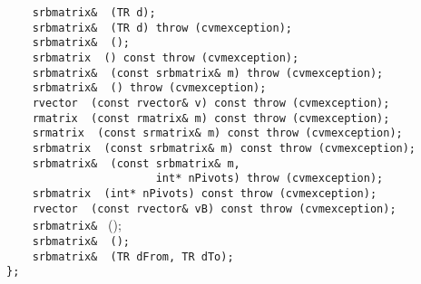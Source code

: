 \verb"    srbmatrix& "\verb" (TR d);"\\
\verb"    srbmatrix& "\verb" (TR d) throw (cvmexception);"\\
\verb"    srbmatrix& "\verb" ();"\\
\verb"    srbmatrix "\verb" () const throw (cvmexception);"\\
\verb"    srbmatrix& "\verb" (const srbmatrix& m) throw (cvmexception);"\\
\verb"    srbmatrix& "\verb" () throw (cvmexception);"\\
\verb"    rvector "\verb" (const rvector& v) const throw (cvmexception);"\\
\verb"    rmatrix "\verb" (const rmatrix& m) const throw (cvmexception);"\\
\verb"    srmatrix "\verb" (const srmatrix& m) const throw (cvmexception);"\\
\verb"    srbmatrix "\verb" (const srbmatrix& m) const throw (cvmexception);"\\
\verb"    srbmatrix& "\verb" (const srbmatrix& m,"\\
\verb"                       int* nPivots) throw (cvmexception);"\\
\verb"    srbmatrix "\verb" (int* nPivots) const throw (cvmexception);"\\
\verb"    rvector "\verb" (const rvector& vB) const throw (cvmexception);"\\
\verb"    srbmatrix& " ();\\
\verb"    srbmatrix& "\verb" ();"\\
\verb"    srbmatrix& "\verb" (TR dFrom, TR dTo);"\\
\verb"};"
\newpage




